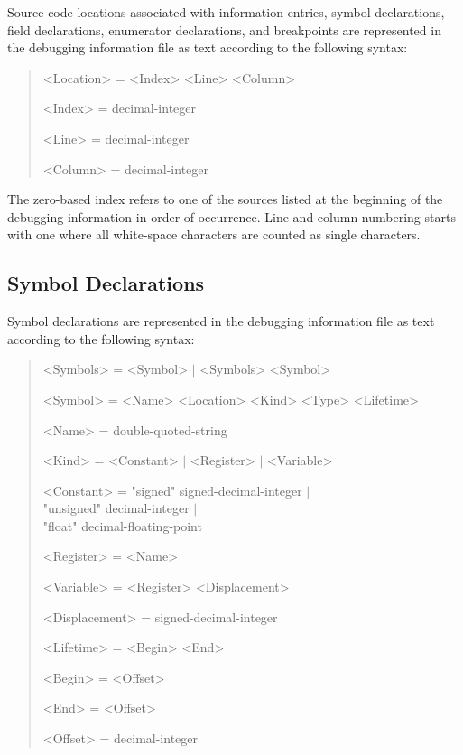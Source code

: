 Source code locations associated with information entries, symbol declarations, field declarations, enumerator declarations, and breakpoints are represented in the debugging information file as text according to the following syntax:

\begin{quote}\begin{grammar}
<Location> = <Index> <Line> <Column> \par
<Index> = decimal-integer \par
<Line> = decimal-integer \par
<Column> = decimal-integer \par
\end{grammar}\end{quote}

The zero-based index refers to one of the sources listed at the beginning of the debugging information in order of occurrence.
Line and column numbering starts with one where all white-space characters are counted as single characters.

\subsection{Symbol Declarations}

Symbol declarations are represented in the debugging information file as text according to the following syntax:

\begin{quote}\begin{grammar}
<Symbols> = <Symbol> $\mid$ <Symbols> <Symbol> \par
<Symbol> = <Name> <Location> <Kind> <Type> <Lifetime> \par
<Name> = double-quoted-string \par
<Kind> = <Constant> $\mid$ <Register> $\mid$ <Variable> \par
<Constant> = "signed" signed-decimal-integer $\mid$ \\ "unsigned" decimal-integer $\mid$ \\ "float" decimal-floating-point \par
<Register> = <Name> \par
<Variable> = <Register> <Displacement> \par
<Displacement> = signed-decimal-integer \par
<Lifetime> = <Begin> <End> \par
<Begin> = <Offset> \par
<End> = <Offset> \par
<Offset> = decimal-integer \par
\end{grammar}\end{quote}

